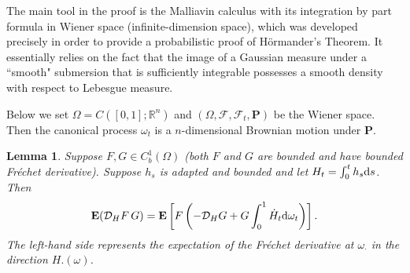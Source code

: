 \documentclass[twoside, 12pt]{book}
\numberwithin{equation}{chapter}
\newtheorem{lemma}[theorem]{Lemma}
\def\cD{{\mathcal D}}
\def\cF{{\mathcal F}}
\def\mR{{\mathbb R}}
\def\bE{{\mathbf E}}
\def\bP{{\mathbf P}}
\def\l{\left}
\def\r{\right}
\def\d{\text{\rm{d}}}
\begin{document}
    The main tool in the proof is the Malliavin calculus with its integration by part formula in Wiener space (infinite-dimension space), which was developed precisely in order to provide a probabilistic proof of Hörmander's Theorem. It essentially relies on the fact that the image of a Gaussian measure under a ``smooth" submersion that is sufficiently integrable possesses a smooth density with respect to Lebesgue measure. 
    
    Below we set $\Omega=C([0,1];\mR^n)$ and $(\Omega, \cF, \cF_t, \bP)$ be the Wiener space. Then the canonical process $\omega_t$ is a $n$-dimensional Brownian motion under $\bP$. 
    
    \begin{lemma}\label{lem:IBP}
       Suppose $F, G\in C^1_b(\Omega)$ (both $F$ and $G$ are bounded and have bounded Fréchet derivative). Suppose $h_s$ is adapted and bounded and let $H_t=\int_0^t h_s \d s$. Then
       \begin{equation}\label{eq:IBP}
       	    \bE (\cD_H F\, G) = \bE\l[ F \l(-\cD_H G+G  \int_0^1 \dot H_t \d \omega_t\r) \r]. 
       \end{equation}
       The left-hand side represents the expectation of the Fréchet derivative at $\omega_{\cdot}$ in the direction $H.(\omega)$.
    \end{lemma}
\end{document}
